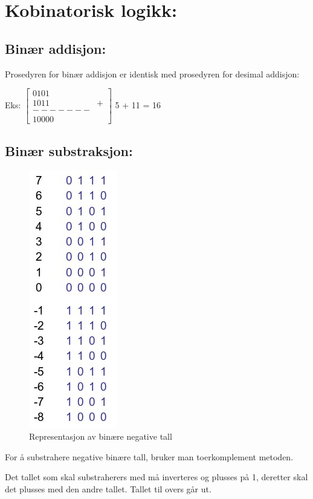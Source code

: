 \documentclass{article}
\begin{document}
	
	\section{Kobinatorisk logikk:}
	
	\subsection{Binær addisjon:}
	 Prosedyren for binær addisjon er identisk med prosedyren for desimal addisjon:
	 
	 Eks: 
	 $\begin{bmatrix}
	 0 1 0 1 \\
	 1 0 1 1 & + \\
	 ------- \\
	 1 0 0 0 0
	 \end{bmatrix}$
	5 + 11 = 16
	\subsection{Binær substraksjon:}
	\begin{figure}[H]
		\includegraphics[scale = 0.7]{Nega.jpg}
		\caption{Representasjon av binære negative tall}
	\end{figure}
	
	For å substrahere negative binære tall, bruker man toerkomplement metoden.
	
	Det tallet som skal substraherers med må inverteres og plusses på 1, deretter skal det plusses med den andre tallet. Tallet til overs går ut.
	
\end{document}
